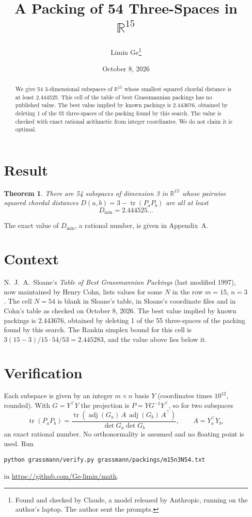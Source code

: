 \documentclass[11pt,a4paper]{article}
\title{A Packing of 54 Three-Spaces in $\mathbb{R}^{15}$}
\author{Limin Ge\thanks{Found and checked by Claude, a model released by Anthropic, running on the author's laptop. The author sent the prompts.}}
\date{October 8, 2026}
\newtheorem*{theorem}{Theorem}
\begin{document}
\maketitle
\begin{abstract}
We give 54 3-dimensional subspaces of $\mathbb{R}^{15}$ whose smallest squared chordal distance is at least 2.444525. This cell of the table of best Grassmannian packings has no published value. The best value implied by known packings is 2.443676, obtained by deleting 1 of the 55 three-spaces of the packing found by this search. The value is checked with exact rational arithmetic from integer coordinates. We do not claim it is optimal.
\end{abstract}

\section{Result}
\begin{theorem}
There are 54 subspaces of dimension 3 in $\mathbb{R}^{15}$ whose pairwise squared chordal distances $D(a,b) = 3 - \operatorname{tr}(P_aP_b)$ are all at least
\[ D_{\min} = 2.444525\ldots \]
\end{theorem}
The exact value of $D_{\min}$, a rational number, is given in Appendix~A.


\section{Context}
N.~J.~A.~Sloane's \emph{Table of Best Grassmannian Packings} (last modified 1997), now maintained by Henry Cohn, lists values for some $N$ in the row $m=15$, $n=3$. The cell $N=54$ is blank in Sloane's table, in Sloane's coordinate files and in Cohn's table as checked on October 8, 2026. The best value implied by known packings is 2.443676, obtained by deleting 1 of the 55 three-spaces of the packing found by this search. The Rankin simplex bound for this cell is $3(15-3)/15\cdot 54/53 = 2.445283$, and the value above lies below it.


\section{Verification}
Each subspace is given by an integer $m\times n$ basis $Y$ (coordinates times $10^{12}$, rounded). With $G=Y^\top Y$ the projection is $P=YG^{-1}Y^\top$, so for two subspaces
\[ \operatorname{tr}(P_aP_b)=\frac{\operatorname{tr}(\operatorname{adj}(G_a)\,A\,\operatorname{adj}(G_b)\,A^\top)}{\det G_a\det G_b},\qquad A=Y_a^\top Y_b, \]
an exact rational number. No orthonormality is assumed and no floating point is used. Run
\begin{verbatim}
python grassmann/verify.py grassmann/packings/m15n3N54.txt
\end{verbatim}
in \url{https://github.com/Ge-limin/math}.
\end{document}
